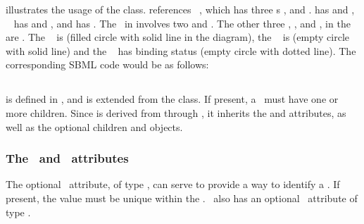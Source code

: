  illustrates the usage of the \OutwardBindingSite class.   references \speciesType\ , which has three \speciesTypeInstance s ,  and .   has   and ,  \speciesTypeInstance\  has   and , and   has  . The \inSpeciesTypeBond\ in  involves two   and . The other three , ,  and , in the \species\  are \outwardBindingSites. The \outwardBindingSite\  is  (filled circle with solid line in the diagram), the \outwardBindingSite\  is  (empty circle with solid line) and the \outwardBindingSite\  has binding status  (empty circle with dotted line). The corresponding SBML code would be as follows:



\subsection{}
\label{def:SubListOfSpeciesFeatures}

 is defined in , and is extended from the  class. If present, a \subListOfSpeciesFeatures\ must have one or more \SpeciesFeature children. Since  is derived from  through , it inherits the  and  attributes, as well as the optional children  and  objects. 

\subsubsection{The \idAtt\ and \nameAtt\ attributes}
\label{def:SubListOfSpeciesFeatures:id}

The optional \idAtt\ attribute, of type \SIdPT, can serve to provide a way to identify a \subListOfSpeciesFeatures. If present, the value must be unique within the \species. \SubListOfSpeciesFeatures\ also has an optional \nameAtt\ attribute of type \stringPT.


